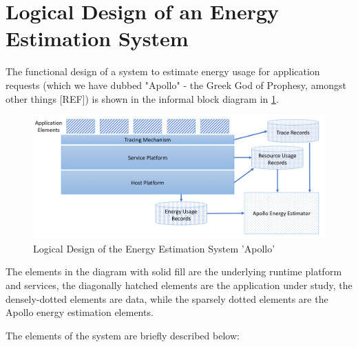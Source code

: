 \section{Logical Design of an Energy Estimation System}

The functional design of a system to estimate energy usage for application requests (which we have dubbed "Apollo" - the Greek God of Prophesy, amongst other things [REF]) is shown in the informal block diagram in \ref{figure:logicaldesign}.

\begin{figure}
\centering
\includegraphics[width=\textwidth]{Figures/estimating-energy-logical}
\caption{Logical Design of the Energy Estimation System 'Apollo'}
\label{figure:logicaldesign}
\end{figure}

The elements in the diagram with solid fill are the underlying runtime platform and services, the diagonally hatched elements are the application under study, the densely-dotted elements are data, while the sparsely dotted elements are the Apollo energy estimation elements.

The elements of the system are briefly described below:

